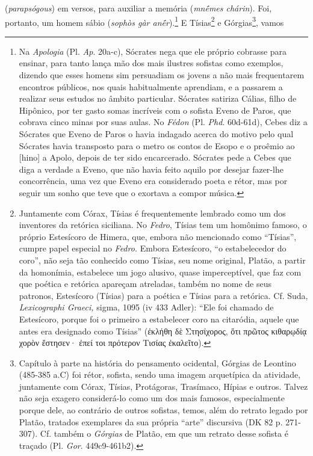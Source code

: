 (\emph{parapsógous}) em versos, para auxiliar a memória (\emph{mnḗmes
chárin}). Foi, portanto, um homem sábio (\emph{sophòs gàr
anḗr}).\footnote{Na \emph{Apologia} (Pl. \emph{Ap}. 20a-c), Sócrates
  nega que ele próprio cobrasse para ensinar, para tanto lança mão dos
  mais ilustres sofistas como exemplos, dizendo que esses homens sim
  persuadiam os jovens a não mais frequentarem encontros públicos, nos
  quais habitualmente aprendiam, e a passarem a realizar seus estudos no
  âmbito particular. Sócrates satiriza Cálias, filho de Hipônico, por
  ter gasto somas incríveis com o sofista Eveno de Paros, que cobrava
  cinco minas por suas aulas. No \emph{Fédon} (Pl. \emph{Phd}. 60d-61d),
  Cebes diz a Sócrates que Eveno de Paros o havia indagado acerca do
  motivo pelo qual Sócrates havia transposto para o metro os contos de
  Esopo e o proêmio ao {[}hino{]} a Apolo, depois de ter sido
  encarcerado. Sócrates pede a Cebes que diga a verdade a Eveno, que não
  havia feito aquilo por desejar fazer-lhe concorrência, uma vez que
  Eveno era considerado poeta e rétor, mas por seguir um sonho que teve
  que o exortava a compor música.} E Tísias\footnote{Juntamente com
  Córax, Tísias é frequentemente lembrado como um dos inventores da
  retórica siciliana. No \emph{Fedro}, Tísias tem um homônimo famoso, o
  próprio Estesícoro de Himera, que, embora não mencionado como
  ``Tísias'', cumpre papel especial no \emph{Fedro.} Embora Estesícoro,
  ``o estabelecedor do coro'', não seja tão conhecido como Tísias, seu
  nome original, Platão, a partir da homonímia, estabelece um jogo
  alusivo, quase imperceptível, que faz com que poética e retórica
  apareçam atreladas, também no nome de seus patronos, Estesícoro
  (Tísias) para a poética e Tísias para a retórica. Cf. Suda,
  \emph{Lexicographi Graeci,} sigma, 1095 (iv 433 Adler): ``Ele foi
  chamado de Estesícoro, porque foi o primeiro a estabelecer coro na
  citaródia, aquele que antes era designado como Tísias'' (ἐκλήθη δὲ
  Στησίχορος, ὅτι πρῶτος κιθαρῳδίᾳ χορὸν ἔστησεν· ἐπεί τοι πρότερον
  Τισίας ἐκαλεῖτο).} e Górgias\footnote{Capítulo à parte na história do
  pensamento ocidental, Górgias de Leontino (485-385 a.C) foi rétor,
  sofista, sendo uma imagem arquetípica da atividade, juntamente com
  Córax, Tísias, Protágoras, Trasímaco, Hípias e outros. Talvez não seja
  exagero considerá-lo como um dos mais famosos, especialmente porque
  dele, ao contrário de outros sofistas, temos, além do retrato legado
  por Platão, tratados exemplares da sua própria ``arte'' discursiva (DK
  82 p. 271-307). Cf. também o \emph{Górgias} de Platão, em que um
  retrato desse sofista é traçado (Pl. \emph{Gor}. 449c9-461b2).}, vamos
